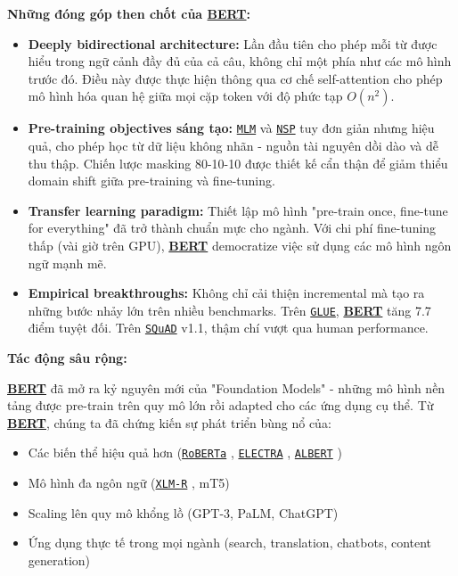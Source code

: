     \textbf{Những đóng góp then chốt của \hyperref[acro:bert]{\textbf{BERT}}:}
    \begin{itemize}
        \item \textbf{Deeply bidirectional architecture:} Lần đầu tiên cho phép mỗi từ được hiểu trong ngữ cảnh đầy đủ của cả câu, không chỉ một phía như các mô hình trước đó. Điều này được thực hiện thông qua cơ chế self-attention cho phép mô hình hóa quan hệ giữa mọi cặp token với độ phức tạp $O(n^2)$.
        
        \item \textbf{Pre-training objectives sáng tạo:} \hyperref[acro:mlm]{\texttt{MLM}} và \hyperref[acro:nsp]{\texttt{NSP}} tuy đơn giản nhưng hiệu quả, cho phép học từ dữ liệu không nhãn - nguồn tài nguyên dồi dào và dễ thu thập. Chiến lược masking 80-10-10 được thiết kế cẩn thận để giảm thiểu domain shift giữa pre-training và fine-tuning.
        
        \item \textbf{Transfer learning paradigm:} Thiết lập mô hình "pre-train once, fine-tune for everything" đã trở thành chuẩn mực cho ngành. Với chi phí fine-tuning thấp (vài giờ trên GPU), \hyperref[acro:bert]{\textbf{BERT}} democratize việc sử dụng các mô hình ngôn ngữ mạnh mẽ.
        
        \item \textbf{Empirical breakthroughs:} Không chỉ cải thiện incremental mà tạo ra những bước nhảy lớn trên nhiều benchmarks. Trên \hyperref[acro:glue]{\texttt{GLUE}}, \hyperref[acro:bert]{\textbf{BERT}} tăng 7.7 điểm tuyệt đối. Trên \hyperref[acro:squad]{\texttt{SQuAD}} v1.1, thậm chí vượt qua human performance.
    \end{itemize}
    
    \textbf{Tác động sâu rộng:}
    
    \hyperref[acro:bert]{\textbf{BERT}} đã mở ra kỷ nguyên mới của "Foundation Models" - những mô hình nền tảng được pre-train trên quy mô lớn rồi adapted cho các ứng dụng cụ thể. Từ \hyperref[acro:bert]{\textbf{BERT}}, chúng ta đã chứng kiến sự phát triển bùng nổ của:
    
    \begin{itemize}
        \item Các biến thể hiệu quả hơn (\hyperref[acro:roberta]{\texttt{RoBERTa}} \cite{liu2019roberta}, \hyperref[acro:electra]{\texttt{ELECTRA}} \cite{clark2020electra}, \hyperref[acro:albert]{\texttt{ALBERT}} \cite{lan2019albert})
        \item Mô hình đa ngôn ngữ (\hyperref[acro:xlm-r]{\texttt{XLM-R}} \cite{conneau2019unsupervised}, mT5)
        \item Scaling lên quy mô khổng lồ (GPT-3, PaLM, ChatGPT)
        \item Ứng dụng thực tế trong mọi ngành (search, translation, chatbots, content generation)
    \end{itemize}
    

